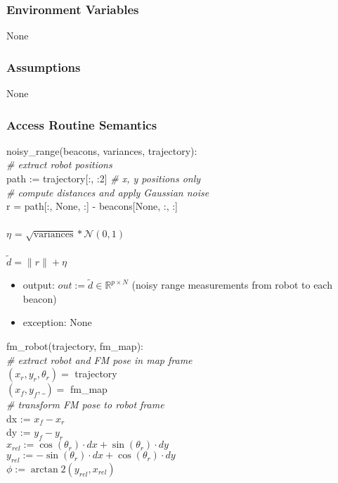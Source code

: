 \documentclass[12pt, titlepage]{article}
\begin{document}
\subsubsection{Environment Variables}
None

\subsubsection{Assumptions}
None

\subsubsection{Access Routine Semantics}

\noindent noisy\_range(beacons, variances, trajectory): \\

\noindent \textit{\# extract robot positions} \\
path := trajectory[:, :2] \textit{\# x, y positions only} \\

\noindent \textit{\# compute distances and apply Gaussian noise} \\
r = path[:, None, :] - beacons[None, :, :] \\\\
$\eta$ = $\sqrt{\mathrm{variances}} * \mathcal{N}(0, 1)$ \\\\
$\tilde{d} = \|r\| + \eta$ 

\begin{itemize}
  \item output: $out := \tilde{d} \in \mathbb{R}^{p \times N}$ (noisy range measurements from robot to each beacon)
  \item exception: None
\end{itemize}

\noindent fm\_robot(trajectory, fm\_map): \\

\noindent \textit{\# extract robot and FM pose in map frame} \\
$(x_r, y_r, \theta_r) =$ trajectory \\
$(x_f, y_f, \_) =$ fm\_map \\

\noindent \textit{\# transform FM pose to robot frame} \\
dx := $x_f - x_r$ \\
 dy := $y_f - y_r$ \\
$x_{rel} := \cos(\theta_r) \cdot dx + \sin(\theta_r) \cdot dy$ \\
$y_{rel} := -\sin(\theta_r) \cdot dx + \cos(\theta_r) \cdot dy$ \\
$\phi := \arctan2(y_{rel}, x_{rel})$ 
\end{document}
